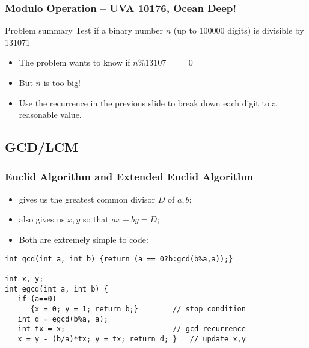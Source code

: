 \documentclass{beamer}
\begin{document}
\begin{frame}
  \frametitle{Modulo Operation -- UVA 10176, Ocean Deep!}
  {\smaller
  \begin{block}{Problem summary}
    Test if a binary number $n$ (up to 100000 digits) is divisible by 131071
  \end{block}

  \begin{itemize}
  \item The problem wants to know if $n\%13107 == 0$
  \item But $n$ is too big!

  \item Use the recurrence in the previous slide to break down each
    digit to a reasonable value.
  \end{itemize}}

\end{frame}

\subsection{GCD/LCM}
\begin{frame}[fragile]
  \frametitle{Euclid Algorithm and Extended Euclid Algorithm}

  {\smaller
    \begin{itemize}
    \item {} gives us the greatest common divisor $D$ of $a,b$;
    \item {} also gives us $x,y$ so that $ax+by = D$;
    \item Both are extremely simple to code:
    \end{itemize}

    \vfill

    \begin{exampleblock}{}
\begin{verbatim}
int gcd(int a, int b) {return (a == 0?b:gcd(b%a,a));}

int x, y;
int egcd(int a, int b) {
   if (a==0)
      {x = 0; y = 1; return b;}        // stop condition
   int d = egcd(b%a, a);
   int tx = x;                         // gcd recurrence
   x = y - (b/a)*tx; y = tx; return d; }   // update x,y
\end{verbatim}
    \end{exampleblock}
}
\end{frame}
\end{document}
